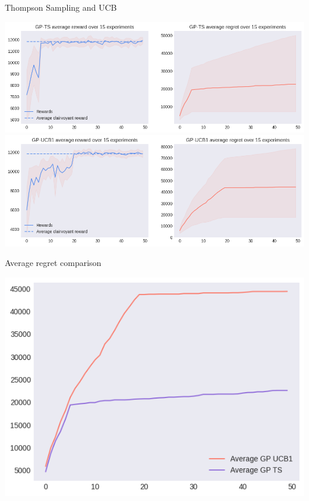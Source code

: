 \vspace*{1em} %

Thompson Sampling and UCB

\begin{center}
	\includegraphics[scale=0.5]{img/Graphs/uncertain_alpha/image4.png}
	\includegraphics[scale=0.5]{img/Graphs/uncertain_alpha/image5.png}
\end{center}

\clearpage %

Average regret comparison

\begin{center}
	\includegraphics[scale=0.5]{img/Graphs/uncertain_alpha/image6.png}
\end{center}


